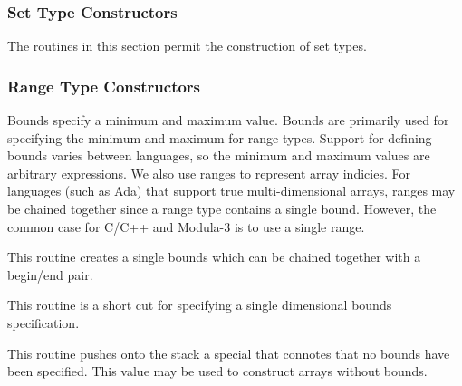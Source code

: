 
\subsubsection{Set Type Constructors}
The routines in this section permit the construction of set types.

\subsubsection{Range Type Constructors}\label{sec:range}
\par
{} 

Bounds specify a minimum and maximum value.  Bounds are primarily used
for specifying the minimum and maximum for range types.  Support for
defining bounds varies between languages, so the minimum and maximum
values are arbitrary expressions.  We also use ranges to represent
array indicies.  For languages (such as Ada) that support true
multi-dimensional arrays, ranges may be chained together since a range
type contains a single bound.  However, the common case for C/C++ and
Modula-3 is to use a single range.

\begin{functionality}
This routine creates a single bounds which can be chained together
with a begin/end pair.
\end{functionality}
\begin{functionality}
\end{functionality}
\begin{functionality}
This routine is a short cut for specifying a single dimensional bounds
specification.
\end{functionality}
\begin{functionality}
This routine pushes onto the stack a special  that
connotes that no bounds have been specified.  This value 
may be used to construct arrays without bounds.
\end{functionality}


